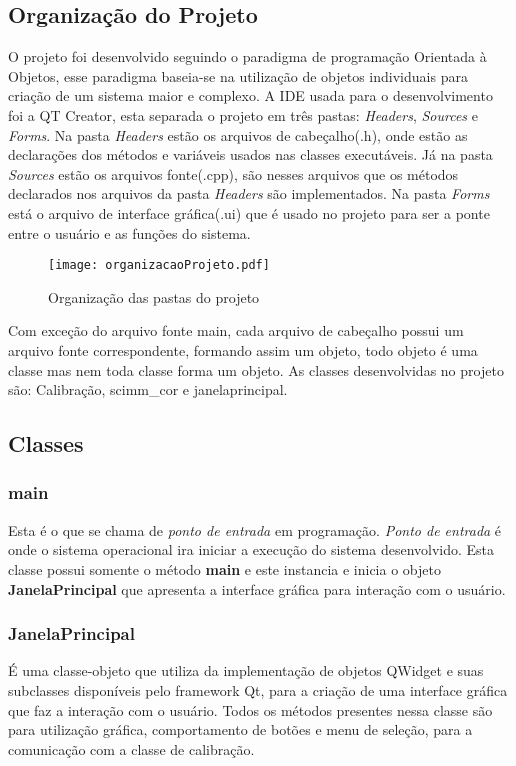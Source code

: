 \subsection{Organização do Projeto}
	 O projeto foi desenvolvido seguindo o paradigma de programação Orientada à Objetos, esse paradigma baseia-se na utilização de objetos individuais para criação de um sistema maior e complexo. A IDE usada para o desenvolvimento foi a QT Creator, esta separada o projeto em três pastas: {\it Headers}, {\it Sources} e {\it Forms}. Na pasta {\it Headers} estão os arquivos de cabeçalho(.h), onde estão as declarações dos métodos e variáveis usados nas classes  executáveis. Já na pasta {\it Sources} estão os arquivos fonte(.cpp), são nesses arquivos que os métodos declarados nos arquivos da pasta {\it Headers} são implementados. Na pasta {\it Forms} está o arquivo de interface gráfica(.ui) que é usado no projeto para ser a ponte entre o usuário e as funções do sistema.
	 
	\begin{figure}[!h]
		\centering
		\texttt{[image: organizacaoProjeto.pdf]}
		\caption{Organização das pastas do projeto}
		\label{Organizacao do Projeto}
	\end{figure}
	Com exceção do arquivo fonte main, cada arquivo de cabeçalho possui um arquivo fonte correspondente, formando assim um objeto, todo objeto é uma classe mas nem toda classe forma um objeto. As classes desenvolvidas no projeto são: Calibração, scimm\_cor e janelaprincipal.

\subsection{Classes}
\subsubsection{main}
 Esta é o que se chama de \textit{ponto de entrada} em programação. \textit{Ponto de entrada} é onde o sistema operacional ira iniciar a execução do sistema desenvolvido. Esta classe possui somente o método \textbf{main} e este instancia e inicia o objeto \textbf{JanelaPrincipal} que apresenta a interface gráfica para interação com o usuário.
 
\subsubsection{JanelaPrincipal}
É uma classe-objeto que utiliza da implementação de objetos QWidget e suas subclasses disponíveis pelo framework Qt, para a criação de uma interface gráfica que faz a interação com o usuário. Todos os métodos presentes nessa classe são para utilização gráfica, comportamento de botões e menu de seleção, para a comunicação com a classe de calibração.	

